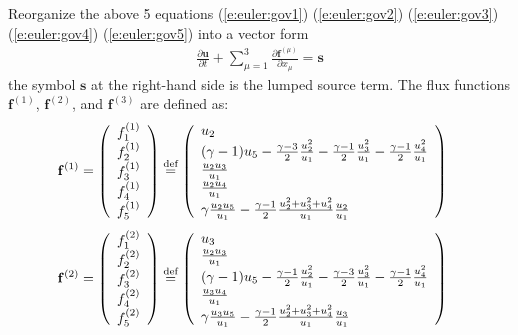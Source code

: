 \documentclass{turgon}
\begin{document}
Reorganize the above 5 equations (\ref{e:euler:gov1}) (\ref{e:euler:gov2})
(\ref{e:euler:gov3}) (\ref{e:euler:gov4}) (\ref{e:euler:gov5}) into a vector
form
%
\begin{align}
  \frac{\partial\mathbf{u}}{\partial t}
  + \sum_{\mu=1}^3 \frac{\partial\mathbf{f}^{(\mu)}}{\partial x_{\mu}}
  = \mathbf{s}
  \label{e:euler:vec}
\end{align}
%
the symbol $\mathbf{s}$ at the right-hand side is the lumped source term.
The flux functions $\mathbf{f}^{(1)}$, $\mathbf{f}^{(2)}$, and
$\mathbf{f}^{(3)}$ are defined as:
%
\begin{align}
  \mathbf{f}^{(1)} &= \left(
  \begin{array}{c}
    f^{(1)}_1 \\ f^{(1)}_2 \\ f^{(1)}_3 \\ f^{(1)}_4 \\ f^{(1)}_5
  \end{array}\right) \defeq \left(
  \begin{array}{l}
    u_2                                   \\
    (\gamma-1)u_5 - \frac{\gamma-3}{2}\frac{u_2^2}{u_1}
    - \frac{\gamma-1}{2}\frac{u_3^2}{u_1}
    - \frac{\gamma-1}{2}\frac{u_4^2}{u_1} \\
    \frac{u_2u_3}{u_1}                    \\
    \frac{u_2u_4}{u_1}                    \\
    \gamma\frac{u_2u_5}{u_1}
    - \frac{\gamma-1}{2}\frac{u_2^2+u_3^2+u_4^2}{u_1}\frac{u_2}{u_1}
  \end{array}\right)
  \label{e:euler:flux1}
\end{align}
%
\begin{align}
  \mathbf{f}^{(2)} &= \left(
  \begin{array}{c}
    f^{(2)}_1 \\ f^{(2)}_2 \\ f^{(2)}_3 \\ f^{(2)}_4 \\ f^{(2)}_5
  \end{array}\right) \defeq \left(
  \begin{array}{l}
    u_3                                   \\
    \frac{u_2u_3}{u_1}                    \\
    (\gamma-1)u_5 - \frac{\gamma-1}{2}\frac{u_2^2}{u_1}
    - \frac{\gamma-3}{2}\frac{u_3^2}{u_1}
    - \frac{\gamma-1}{2}\frac{u_4^2}{u_1} \\
    \frac{u_3u_4}{u_1}                    \\
    \gamma\frac{u_3u_5}{u_1}
    - \frac{\gamma-1}{2}\frac{u_2^2+u_3^2+u_4^2}{u_1}\frac{u_3}{u_1}
  \end{array}\right)
  \label{e:euler:flux2}
\end{align}
\end{document}
